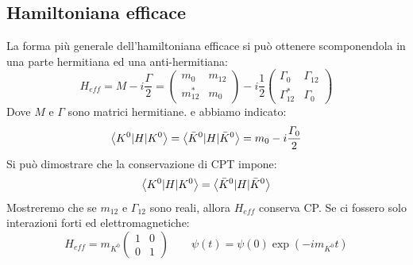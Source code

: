 \subsection{Hamiltoniana efficace}
La forma più generale dell'hamiltoniana efficace si può ottenere scomponendola in una parte hermitiana ed una anti-hermitiana:
\begin{equation*}
    H_{eff}=M-i\frac{\Gamma}{2}=\begin{pmatrix} m_0 & m_{12} \\ m^*_{12} & m_0 \end{pmatrix}-i\frac{1}{2}\begin{pmatrix} \Gamma_0 & \Gamma_{12} \\ \Gamma^*_{12} & \Gamma_0 \end{pmatrix}
\end{equation*}
Dove $M$ e $\Gamma$ sono matrici hermitiane. e abbiamo indicato:
\begin{equation*}
    \left\langle K^0|H| K^0\right\rangle=\left\langle \Bar{K}^0|H| \Bar{K}^0\right\rangle=m_0-i\frac{\Gamma_0}{2}
\end{equation*}
Si può dimostrare che la conservazione di CPT impone:
\begin{equation*}
    \left\langle K^0|H| K^0\right\rangle=\left\langle \Bar{K}^0|H| \Bar{K}^0\right\rangle
\end{equation*}
Mostreremo che se $m_{12}$ e $\Gamma_{12}$ sono reali, allora $H_{eff}$ conserva CP. Se ci fossero solo interazioni forti ed elettromagnetiche:
\begin{equation*}
    H_{eff}=m_{K^0}\begin{pmatrix} 1 & 0 \\ 0 & 1 \end{pmatrix} \qquad \psi(t)=\psi(0)\exp(-im_{K^0}t)
\end{equation*}
